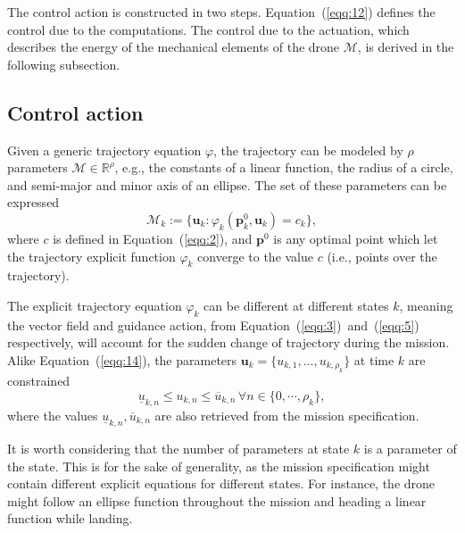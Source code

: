 \documentclass[letterpaper,10pt,conference]{ieeeconf}
\begin{document}
The control action is constructed in two steps. Equation~(\ref{eqq:12}) defines the control due to the computations. The control due to the actuation, which describes the energy of the mechanical elements of the drone $\mathcal{M}$, is derived in the following subsection.

\subsection{Control action}
\label{sec:control-action}

Given a generic trajectory equation $\varphi$, the trajectory can be modeled by $\rho$ parameters $\mathcal{M}\in\mathbb{R}^\rho$, e.g., the constants of a linear function, the radius of a circle, and semi-major and minor axis of an ellipse. The set of these parameters can be expressed
\begin{equation}\label{eqq:14}
  \mathcal{M}_k:=\{\mathbf{u}_k : \varphi_k(\mathbf{p}_k^0,\mathbf{u}_k)=c_k\},
\end{equation}
where $c$ is defined in Equation~(\ref{eqq:2}), and $\mathbf{p}^0$ is any optimal point which let the trajectory explicit function $\varphi_k$ converge to the value $c$ (i.e., points over the trajectory). 

The explicit trajectory equation $\varphi_k$ can be different at different states $k$, meaning the vector field and guidance action, from Equation~(\ref{eqq:3})~and~(\ref{eqq:5}) respectively, will account for the sudden change of trajectory during the mission. Alike Equation~(\ref{eqq:14}), the parameters $\mathbf{u}_k=\{u_{k,1},\dots,u_{k,\rho_k}\}$ at time $k$ are constrained
\begin{equation}
  \underline{u}_{k,n}\leq u_{k,n}\leq \overline{u}_{k,n}\,\forall n\in\{0,\cdots,\rho_k\},
\end{equation}
where the values $\underline{u}_{k,n},\overline{u}_{k,n}$ are also retrieved from the mission specification.

It is worth considering that the number of parameters at state $k$ is a parameter of the state. This is for the sake of generality, as the mission specification might contain different explicit equations for different states. For instance, the drone might follow an ellipse function throughout the mission and heading a linear function while landing. 
\end{document}
